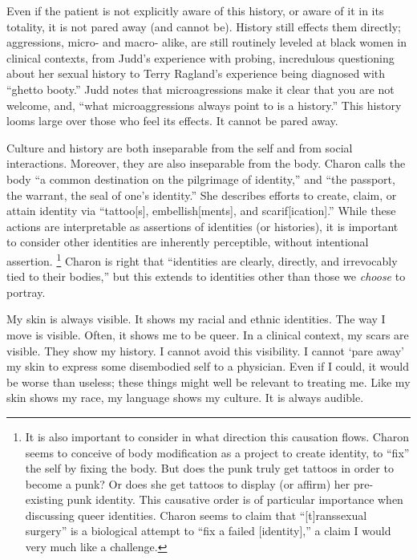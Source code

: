 \documentclass[12pt]{article}
\begin{document}
Even if the patient is not explicitly aware of this history, or aware of it in
its totality, it is not pared away (and cannot be). History still effects them
directly; aggressions, micro- and macro- alike, are still routinely leveled at
black women in clinical contexts, from Judd's experience with probing,
incredulous questioning about her sexual history to Terry Ragland's experience
being diagnosed with ``ghetto booty.''\autocite{Grenoble13,McCowan13} Judd
notes that microagressions make it clear that you are not welcome, and, ``what
microaggressions always point to is a history.''\autocite{Judd15} This history
looms large over those who feel its effects. It cannot be pared away.

Culture and history are both inseparable from the self and from social
interactions. Moreover, they are also inseparable from the body. Charon calls
the body ``a common destination on the pilgrimage of
identity,''\autocite[p.~86]{Charon06} and ``the passport, the warrant, the seal
of one's identity.''\autocite[p.~86]{Charon06} She describes efforts to create,
claim, or attain identity via ``tattoo[s], embellish[ments], and
scarif[ication].''\autocite[p.~86]{Charon06} While these actions are
interpretable as assertions of identities (or histories), it is important to
consider other identities are inherently perceptible, without intentional
assertion.%
	\footnote{It is also important to consider in what direction this causation
	flows. Charon seems to conceive of body modification as a project to create
	identity, to ``fix'' the self by fixing the body. But does the punk truly
	get tattoos in order to become a punk? Or does she get tattoos to display
	(or affirm) her pre-existing punk identity. This causative order is of
	particular importance when discussing queer identities. Charon seems to
	claim that ``[t]ranssexual surgery'' is a biological attempt to ``fix a
	failed [identity],'' a claim I would very much like a challenge.}
Charon is right that ``identities are clearly, directly, and
irrevocably tied to their bodies,''\autocite[p.~87]{Charon06} but this extends
to identities other than those we \emph{choose} to portray.


My skin is always visible. It shows my racial and ethnic identities. The way I
move is visible. Often, it shows me to be queer. In a clinical context, my scars
are visible. They show my history. I cannot avoid this visibility. I cannot
`pare away' my skin to express some disembodied self to a physician. Even if I
could, it would be worse than useless; these things might well be relevant to
treating me.  Like my skin shows my race, my language shows my culture. It is
always audible.
\end{document}

